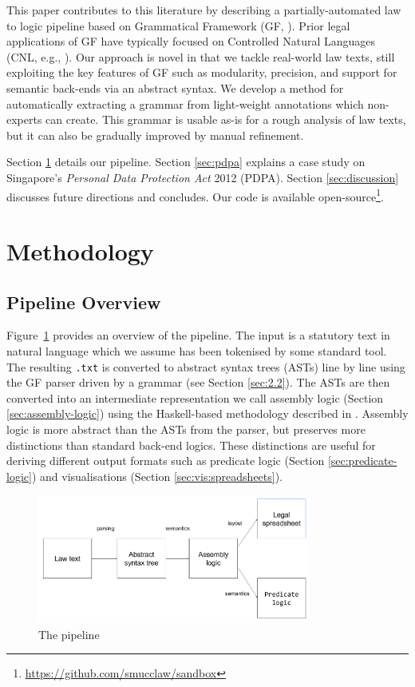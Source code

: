 \documentclass{IOS-Book-Article}
\begin{document}
This paper contributes to this literature by describing a partially-automated law to logic pipeline based on Grammatical Framework (GF, \cite{ranta-2011}). Prior legal applications of GF \cite{angelov-al-2013, gdpr-2018} have typically focused on Controlled Natural Languages (CNL, e.g., \cite{fuchs-al-2008, angelov-ranta-2009}).
Our approach is novel in that we tackle real-world law texts, still exploiting the key features of GF such as modularity, precision, and support for semantic back-ends via an abstract syntax. We develop a method for automatically extracting a grammar from light-weight annotations which non-experts can create. This grammar is usable as-is for a rough analysis of law texts, but it can also be gradually improved by manual refinement.

Section \ref{sec:methods} details our pipeline. Section \ref{sec:pdpa} explains a case study on Singapore's \textit{Personal Data Protection Act} 2012 (PDPA). Section \ref{sec:discussion} discusses future directions and concludes.
Our code is available open-source\footnote{\url{https://github.com/smucclaw/sandbox}}.

\section{Methodology}
\label{sec:methods}

\subsection{Pipeline Overview}

Figure~\ref{pipeline} provides an overview of the pipeline. The input is a statutory text in natural language which we assume has been tokenised by some standard tool.
The resulting \texttt{.txt} is converted to abstract syntax trees (ASTs) line by line using the GF parser driven by a grammar (see Section \ref{sec:2.2}). 
The ASTs are then converted into an intermediate representation we call assembly logic (Section \ref{sec:assembly-logic}) using the Haskell-based methodology described in \cite{ranta-2011c}. Assembly logic is more abstract than the ASTs from the parser, but preserves more distinctions than standard back-end logics.
These distinctions are useful for deriving different output formats such as predicate logic (Section \ref{sec:predicate-logic}) and visualisations (Section \ref{sec:vis:spreadsheets}).

\begin{figure}[h!]
    \includegraphics[width=0.8\textwidth]{pipeline.png}
\caption{The pipeline}
\label{pipeline}
\end{figure}
\end{document}
